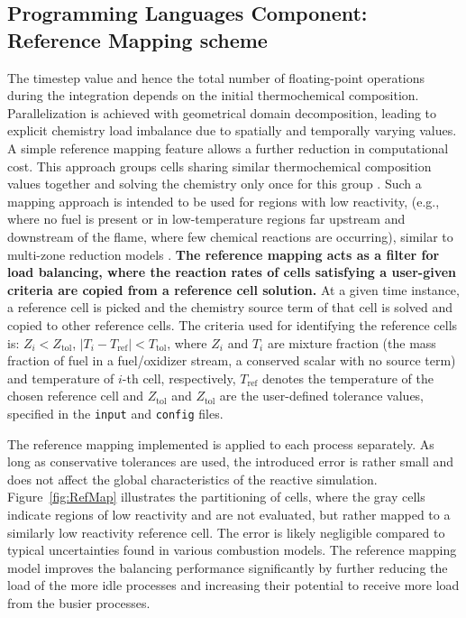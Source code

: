 \documentclass[letterpaper,twocolumn,10pt]{article}
\begin{document}
\subsection{Programming Languages Component: \\Reference Mapping scheme}
\noindent The timestep value and hence the total number of floating-point operations during the integration depends on the initial thermochemical composition. Parallelization is achieved with geometrical domain decomposition, leading to explicit chemistry load imbalance due to spatially and temporally varying values. A simple reference mapping feature allows a further reduction in computational cost. This approach groups cells sharing similar thermochemical composition values together and solving the chemistry only once for this group \cite{DLBFoam_1}. Such a mapping approach is intended to be used for regions with low reactivity, (e.g., where no fuel is present or in low-temperature regions far upstream and downstream of the flame, where few chemical reactions are occurring), similar to multi-zone reduction models \cite{Zonal}. \textbf{The reference mapping acts as a filter for load balancing, where the reaction rates of cells satisfying a user-given criteria are copied from a reference cell solution.} At a given time instance, a reference cell is picked and the chemistry source term of that cell is solved and copied to other reference cells. The criteria used for identifying the reference cells is: $Z_i < Z_\textrm{tol}$, $|T_i - T_\textrm{ref} | < T_\textrm{tol}$, where $Z_i$ and $T_i$ are mixture fraction (the mass fraction of fuel in a fuel/oxidizer stream, a conserved scalar with no source term) and temperature of $i$-th cell, respectively, $T_\textrm{ref}$ denotes the temperature of the chosen reference cell and $Z_\textrm{tol}$ and $Z_\textrm{tol}$ are the user-defined tolerance values, specified in the \texttt{input} and \texttt{config} files.

The reference mapping implemented is applied to each process separately. As long as conservative tolerances are used, the introduced error is rather small and does not affect the global characteristics of the reactive simulation. Figure~\ref{fig:RefMap} illustrates the partitioning of cells, where the gray cells indicate regions of low reactivity and are not evaluated, but rather mapped to a similarly low reactivity reference cell. The error is likely negligible compared to typical uncertainties found in various combustion models. The reference mapping model improves the balancing performance significantly by further reducing the load of the more idle processes and increasing their potential to receive more load from the busier processes.
\end{document}
